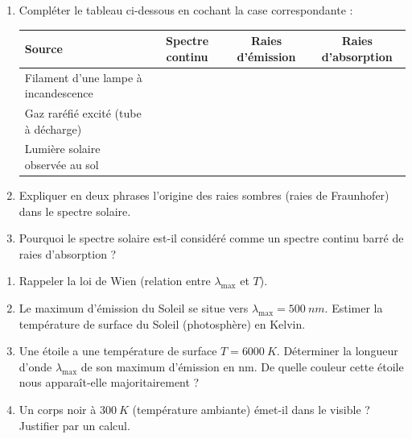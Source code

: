 \documentclass[11pt]{article}
\begin{document}
\begin{exercice}
\begin{enumerate}
    \item Compléter le tableau ci-dessous en cochant la case correspondante :
    \begin{center}
    \begin{tabular}{|l|c|c|c|}
    \hline
    \textbf{Source} & \textbf{Spectre continu} & \textbf{Raies d'émission} & \textbf{Raies d'absorption} \\
    \hline
    Filament d'une lampe à incandescence & & & \\
    \hline
    Gaz raréfié excité (tube à décharge) & & & \\
    \hline
    Lumière solaire observée au sol & & & \\
    \hline
    \end{tabular}
    \end{center}
    \item Expliquer en deux phrases l'origine des raies sombres (raies de Fraunhofer) dans le spectre solaire.
    \item Pourquoi le spectre solaire est-il considéré comme un spectre continu \og barré \fg de raies d'absorption ?
\end{enumerate}
\end{exercice}

\begin{exercice}
\begin{enumerate}
    \item Rappeler la loi de Wien (relation entre $\lambda_{\text{max}}$ et $T$).
    \item Le maximum d'émission du Soleil se situe vers $\lambda_{\text{max}} = \SI{500}{nm}$. Estimer la température de surface du Soleil (photosphère) en Kelvin.
    \item Une étoile a une température de surface $T = \SI{6000}{K}$. Déterminer la longueur d'onde $\lambda_{\text{max}}$ de son maximum d'émission en nm. De quelle couleur cette étoile nous apparaît-elle majoritairement ?
    \item Un corps noir à $\SI{300}{K}$ (température ambiante) émet-il dans le visible ? Justifier par un calcul.
\end{enumerate}
\end{exercice}
\end{document}
